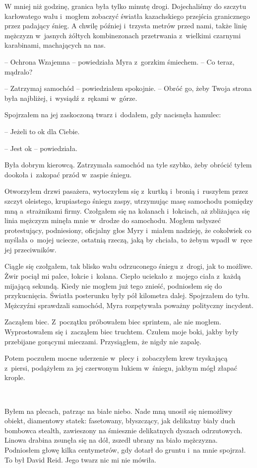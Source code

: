 \documentclass[oneside,polish,11pt,sfheadings]{mwbk}
\begin{document}
W mniej niż godzinę, granica była tylko minutę drogi. Dojechaliśmy do
szczytu karłowatego wału i~mogłem zobaczyć światła kazachskiego
przejścia granicznego przez padający śnieg. A chwilę później i~trzysta
metrów przed nami, także linię mężczyzn w~jasnych żółtych kombinezonach
przetrwania z~wielkimi czarnymi karabinami, machających na nas.

-- Ochrona Wzajemna -- powiedziała Myra z~gorzkim śmiechem. -- Co teraz,
mądralo?

-- Zatrzymaj samochód -- powiedziałem spokojnie. -- Obróć go, żeby Twoja
strona była najbliżej, i~wysiądź z~rękami w~górze.

Spojrzałem na jej zaskoczoną twarz i~dodałem, gdy nacisnęła hamulec: 

-- Jeżeli to ok dla Ciebie.

-- Jest ok -- powiedziała.

Była dobrym kierowcą. Zatrzymała samochód na tyle szybko, żeby obrócić
tyłem dookoła i~zakopać przód w~zaspie śniegu.

Otworzyłem drzwi pasażera, wytoczyłem się z~kurtką i~bronią i~ruszyłem
przez szczyt oleistego, krupiastego śniegu zaspy, utrzymując masę
samochodu pomiędzy mną a~strażnikami firmy. Czołgałem się na kolanach i~łokciach, aż zbliżająca się linia mężczyzn minęła mnie w~drodze do
samochodu. Mogłem usłyszeć protestujący, podniesiony, oficjalny głos
Myry i~miałem nadzieję, że cokolwiek co myślała o~mojej uciecze,
ostatnią rzeczą, jaką by chciała, to żebym wpadł w~ręce jej
przeciwników.

Ciągle się czołgałem, tak blisko wału odrzuconego śniegu z~drogi, jak to
możliwe. Żwir pociął mi palce, łokcie i~kolana. Ciepło uciekało z~mojego
ciała z~każdą mijającą sekundą. Kiedy nie mogłem już tego znieść,
podniosłem się do przykucnięcia. Światła posterunku były pół kilometra
dalej. Spojrzałem do tyłu. Mężczyźni sprawdzali samochód, Myra
rozpętywała poważny polityczny incydent.

Zacząłem biec. Z~początku próbowałem biec sprintem, ale nie mogłem.
Wyprostowałem się i~zacząłem biec truchtem. Czułem moje boki, jakby były
przebijane gorącymi mieczami. Przysiągłem, że nigdy nie zapalę.

Potem poczułem mocne uderzenie w~plecy i~zobaczyłem krew tryskającą z~piersi, podążyłem za jej czerwonym łukiem w~śniegu, jakbym mógł złapać
krople.

~

Byłem na plecach, patrząc na białe niebo. Nade mną unosił się niemożliwy
obiekt, diamentowy statek: fasetowany, błyszczący, jak delikatny biały
duch bombowca stealth, zawieszony na śmiesznie delikatnych dyszach
odrzutowych. Linowa drabina zsunęła się na dół, zszedł ubrany na biało
mężczyzna. Podniosłem głowę kilka centymetrów, gdy dotarł do gruntu i~na
mnie spojrzał. To był David Reid. Jego twarz nic mi nie mówiła.
\end{document}
